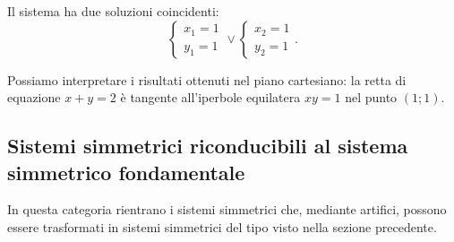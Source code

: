 \begin{exrig}
\begin{esempio}
\begin{multicols}{2}
Il sistema ha due soluzioni coincidenti: \[ \left\{\begin{array}{l}{x_1=1}\\{y_1=1}\end{array}\right.\vee \left\{\begin{array}{l}{x_2=1}\\{y_2=1}\end{array}\right.. \]

Possiamo interpretare i risultati ottenuti nel piano cartesiano: la retta di equazione $x+y=2$ è tangente all'iperbole equilatera $xy=1$ nel punto $(1;1)$.
\begin{center}

\end{center}
\end{multicols}
\end{esempio}
\end{exrig}
\ovalbox{\risolvii \ref{ese:6.14}, \ref{ese:6.15}, \ref{ese:6.16}, \ref{ese:6.17}, \ref{ese:6.18}, \ref{ese:6.19}}

\subsection{Sistemi simmetrici riconducibili al sistema simmetrico fondamentale}

In questa categoria rientrano i sistemi simmetrici che, mediante artifici, possono essere trasformati in sistemi simmetrici del tipo visto nella sezione precedente.

